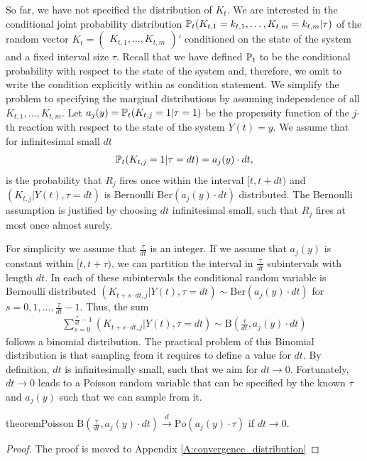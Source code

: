 So far, we have not specified the distribution of $K_t$. We are interested in the conditional joint probability distribution $\mathbb{P}_t(K_{t,1} = k_{t,1}, \dots, K_{t,m} = k_{t,m}|\tau)$ of the random vector $K_t = \begin{pmatrix}
K_{t,1}, \dots, K_{t,m} \end{pmatrix}'$ conditioned on the state of the system and a fixed interval size $\tau$. Recall that we have defined $\mathbb{P}_t$ to be the conditional probability with respect to the state of the system and, therefore, we omit to write the condition explicitly within as condition statement. We simplify the problem to specifying the marginal distributions by assuming independence of all $K_{t, 1},\hdots, K_{t, m}$. Let $a_j(y) = \mathbb{P}_t(K_{t,j}=1|\tau=1)$ be the propensity function of the $j$-th reaction with respect to the state of the system $Y(t)=y$. We assume that for infinitesimal small $dt$
\begin{align}
\mathbb{P}_t(K_{t,j} = 1|\tau = dt) = a_j(y) \cdot dt,
\end{align}
is the probability that $R_j$ fires once within the interval $[t, t+dt)$ and $\left(K_{t,j}|Y(t), \tau =dt \right)$ is Bernoulli $\mathrm{Ber}(a_j(y) \cdot dt)$ distributed. The Bernoulli assumption is justified by choosing $dt$ infinitesimal small, such that $R_j$ fires at most once almost surely.

For simplicity we assume that $\frac{\tau}{dt}$ is an integer. If we assume that $a_j(y)$ is constant within $[t, t+\tau)$, we can partition the interval in $\frac{\tau}{dt}$ subintervals with length $dt$. In each of these subintervals the conditional random variable is Bernoulli distributed $\left(K_{t+s \cdot dt,j}|Y(t), \tau =dt\right) \sim \mathrm{Ber}(a_j(y) \cdot dt)$ for $s=0, 1, \dots, \frac{\tau}{dt} - 1$. Thus, the sum
\begin{align}
\sum_{s=0}^{\frac{\tau}{dt}-1} \left(K_{t+s \cdot dt, j} | Y(t), \tau = dt\right) \sim \textrm{B}\left(\frac{\tau}{dt}, a_j(y) \cdot dt\right)
\end{align}
follows a binomial distribution. The practical problem of this Binomial distribution is that sampling from it requires to define a value for $dt$. By definition, $dt$ is infinitesimally  small, such that we aim for $dt \to 0$. Fortunately, $dt \to 0$ leads to a Poisson random variable that can be specified by the known $\tau$ and $a_j(y)$ such that we can sample from it.
\begin{restatable}{theorem}{Poisson}
$\textrm{B}\left(\frac{\tau}{dt}, a_j(y) \cdot dt\right) \xrightarrow{d} \textrm{Po}(a_j(y) \cdot \tau)$ if $dt \to 0$.
\end{restatable}
\begin{proof}
The proof is moved to Appendix \ref{A:convergence_distribution}
\end{proof}


